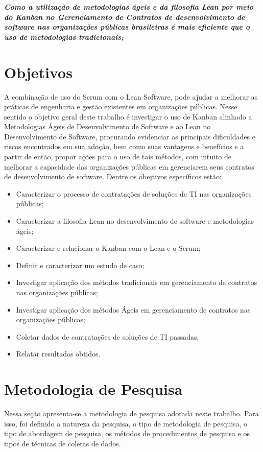 \textit{\textbf {Como a utilização de metodologias ágeis e da filosofia Lean por meio do Kanban no Gerenciamento de Contratos de desenvolvimento de software nas organizações públicas brasileiras é mais eficiente que o uso de metodologias tradicionais;}}

\section[Objetivos]{Objetivos}

A combinação de uso do Scrum com o Lean Software, pode ajudar a melhorar as práticas de engenharia e gestão existentes em organizações públicas. Nesse sentido o objetivo geral deste trabalho é investigar o uso de Kanban alinhado a Metodologias Ágeis de Desenvolvimento de Software e ao Lean no Desenvolvimento de Software, procurando evidenciar as principais dificuldades e riscos encontrados em sua adoção, bem como suas vantagens e benefícios e a partir de então, propor ações para o uso de tais métodos, com intuito de melhorar a capacidade das organizações públicas em gerenciarem seus contratos de desenvolvimento de software. Dentre os obejtivos específicos estão:

\begin{itemize}
\item Caracterizar o processo de contratações de soluções de TI nas organizações públicas;
\item Caracterizar a filosofia Lean no desenvolvimento de software e metodologias ágeis;
\item Caracterizar e relacionar o Kanban com o Lean e o Scrum;
\item Definir e caracterizar um estudo de caso;
\item Investigar aplicação dos métodos tradicionais em gerenciamento de contratos nas organizações públicas;
\item Investigar aplicação dos métodos Ágeis em gerenciamento de contratos nas organizações públicas;
\item Coletar dados de contratações de soluções de TI passadas;
\item Relatar resultados obtidos.
\end{itemize}

\section[Metodologia de Pesquisa]{Metodologia de Pesquisa}

Nessa seção apresenta-se a metodologia de pesquisa adotada neste trabalho.
Para isso, foi definido a natureza da pesquisa, o tipo de metodologia de pesquisa, o tipo de abordagem de pesquisa, os métodos de
procedimentos de pesquisa e os tipos de técnicas de coletas de dados.

